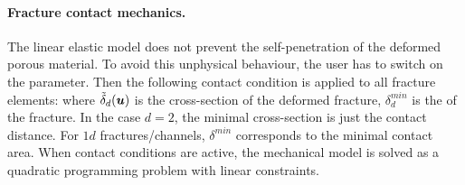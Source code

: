\paragraph{Fracture contact mechanics.}
The linear elastic model does not prevent the self-penetration of the deformed porous material.
To avoid this unphysical behaviour, the user has to switch on the  parameter.
Then the following contact condition is applied to all fracture elements:
where $\tilde\delta_d(\mathbf{\boldsymbol{u}})$  is the cross-section of the deformed fracture, $\delta_d^{min}$  is the  of the fracture.
In the case $d=2$, the minimal cross-section is just the contact distance.
For $1d$ fractures/channels, $\delta^{min}$ corresponds to the minimal contact area.
When contact conditions are active, the mechanical model is solved as a quadratic programming problem with linear constraints.


